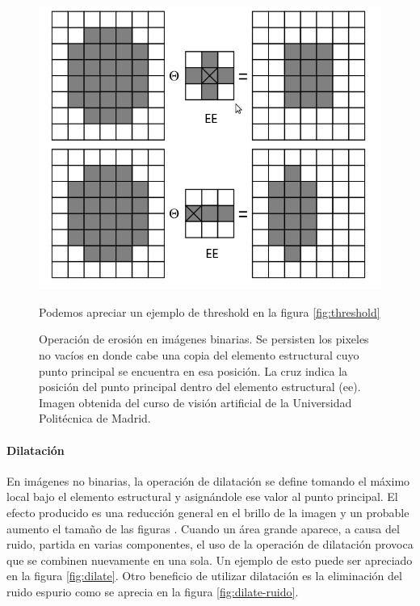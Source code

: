 \begin{figure}[tpb]
\begin{center}
  \includegraphics[scale=0.4]{figuras/erode-sample.png}
\end{center}Podemos apreciar un ejemplo de threshold en la figura \ref{fig:threshold}
  \caption{\small Operación de erosión en imágenes binarias. Se persisten los pixeles no vacíos en donde cabe una copia del elemento estructural cuyo punto principal se encuentra en esa posición. La cruz indica la posición del punto principal dentro del elemento estructural (ee). Imagen obtenida del curso de visión artificial de la Universidad Politécnica de Madrid. } 
  \label{fig:erode-sample}
\end{figure}

	\paragraph{Dilatación}
En imágenes no binarias, la operación de dilatación se define 
tomando el máximo local bajo el elemento estructural y asignándole ese valor al punto principal. El efecto producido es una reducción general en el brillo de la imagen y un probable aumento el tamaño de las figuras \cite{nasa-dilate-erode}.  Cuando un área grande aparece, a causa del ruido, partida en varias componentes, el uso de la operación de dilatación provoca que  se combinen nuevamente en una sola. Un ejemplo de esto puede ser apreciado en la figura \ref{fig:dilate}. Otro beneficio de utilizar dilatación es la eliminación del ruido espurio como se aprecia en la figura \ref{fig:dilate-ruido}.

